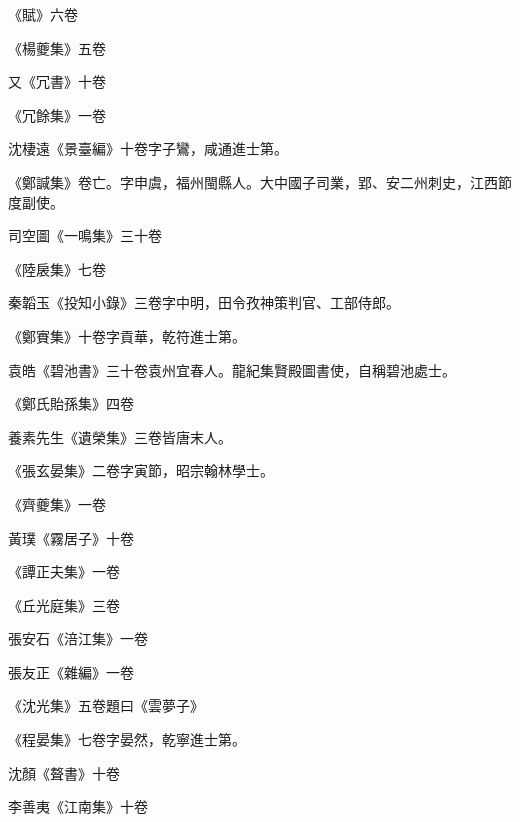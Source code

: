 \begin{pinyinscope}
 《賦》六卷



 《楊夔集》五卷



 又《冗書》十卷



 《冗餘集》一卷



 沈棲遠《景臺編》十卷字子鸞，咸通進士第。



 《鄭諴集》卷亡。字申虞，福州閩縣人。大中國子司業，郢、安二州刺史，江西節度副使。



 司空圖《一鳴集》三十卷



 《陸扆集》七卷



 秦韜玉《投知小錄》三卷字中明，田令孜神策判官、工部侍郎。



 《鄭賨集》十卷字貢華，乾符進士第。



 袁皓《碧池書》三十卷袁州宜春人。龍紀集賢殿圖書使，自稱碧池處士。



 《鄭氏貽孫集》四卷



 養素先生《遺榮集》三卷皆唐末人。



 《張玄晏集》二卷字寅節，昭宗翰林學士。



 《齊夔集》一卷



 黃璞《霧居子》十卷



 《譚正夫集》一卷



 《丘光庭集》三卷



 張安石《涪江集》一卷



 張友正《雜編》一卷



 《沈光集》五卷題曰《雲夢子》



 《程晏集》七卷字晏然，乾寧進士第。



 沈顏《聱書》十卷



 李善夷《江南集》十卷




\end{pinyinscope}
